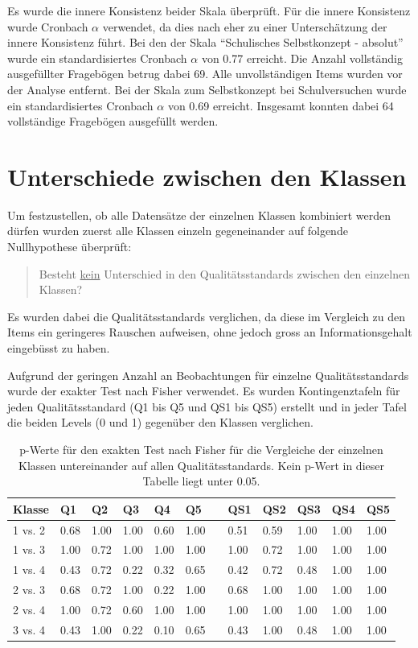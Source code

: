 \label{txt:Cronbach}
Es wurde die innere Konsistenz beider Skala überprüft. Für die innere Konsistenz wurde Cronbach $\alpha$ verwendet, da dies nach \citet{Eisinga2013} eher zu einer Unterschätzung der innere Konsistenz führt. Bei den der Skala "`Schulisches Selbstkonzept - absolut"' wurde ein standardisiertes Cronbach $\alpha$ von 0.77 erreicht. Die Anzahl vollständig ausgefüllter Fragebögen betrug dabei 69. Alle unvollständigen Items wurden vor der Analyse entfernt. Bei der Skala zum Selbstkonzept bei Schulversuchen wurde ein standardisiertes Cronbach $\alpha$ von 0.69 erreicht. Insgesamt konnten dabei 64 vollständige Fragebögen ausgefüllt werden. 


\section{Unterschiede zwischen den Klassen}

Um festzustellen, ob alle Datensätze der einzelnen Klassen kombiniert werden dürfen wurden zuerst alle Klassen einzeln gegeneinander auf folgende Nullhypothese überprüft: 
\begin{quote}
Besteht \underline{kein} Unterschied in den Qualitätsstandards zwischen den einzelnen Klassen?
\end{quote}
Es wurden dabei die Qualitätsstandards verglichen, da diese im Vergleich zu den Items ein geringeres Rauschen aufweisen, ohne jedoch gross an Informationsgehalt eingebüsst zu haben.


Aufgrund der geringen Anzahl an Beobachtungen für einzelne Qualitätsstandards wurde der exakter Test nach Fisher verwendet. Es wurden Kontingenztafeln für jeden Qualitätsstandard (Q1 bis Q5 und QS1 bis QS5) erstellt und in jeder Tafel die beiden Levels (0 und 1) gegenüber den Klassen verglichen.


\begin{table}[htbp]
  \centering
\begin{tabular}{@{}llllllllllll@{}}
\toprule
 Klasse & Q1 & Q2 & Q3 & Q4 & Q5 && QS1 & QS2 & QS3 & QS4 & QS5 \\ 
\midrule
 1 vs. 2 &   0.68 & 1.00 & 1.00 & 0.60 & 1.00 && 0.51 & 0.59 & 1.00 & 1.00 & 1.00   \\ 
 1 vs. 3 &   1.00 & 0.72 & 1.00 & 1.00 & 1.00 && 1.00 & 0.72 & 1.00 & 1.00 & 1.00   \\
 1 vs. 4 &   0.43 & 0.72 & 0.22 & 0.32 & 0.65 && 0.42 & 0.72 & 0.48 & 1.00 & 1.00   \\
 2 vs. 3 &   0.68 & 0.72 & 1.00 & 0.22 & 1.00 && 0.68 & 1.00 & 1.00 & 1.00 & 1.00   \\
 2 vs. 4 &   1.00 & 0.72 & 0.60 & 1.00 & 1.00 && 1.00 & 1.00 & 1.00 & 1.00 & 1.00   \\
 3 vs. 4 &   0.43 & 1.00 & 0.22 & 0.10 & 0.65 && 0.43 & 1.00 & 0.48 & 1.00 & 1.00   \\
\bottomrule
\end{tabular} 
  \caption{p-Werte für den exakten Test nach Fisher für die Vergleiche der einzelnen Klassen untereinander auf allen Qualitätsstandards. Kein p-Wert in dieser Tabelle liegt unter 0.05. }
  \label{tab:KlassenVergleiche}
\end{table}


